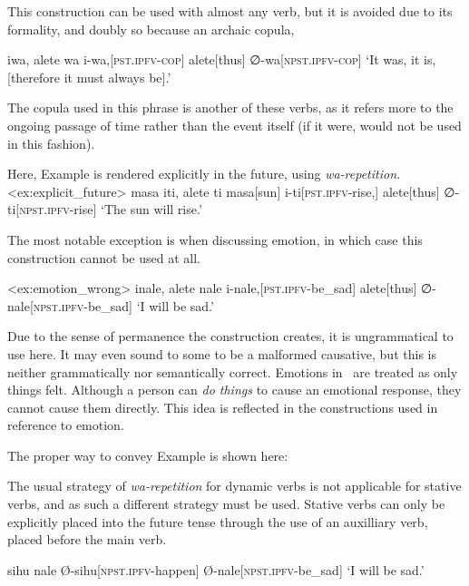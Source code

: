 This construction can be used with almost any verb, but it is avoided due to its formality, and doubly so because an archaic copula, 

\ex
\begingl
\glpreamble iwa, alete wa
\endpreamble
i-wa,[\textsc{pst.ipfv-cop}]
alete[thus]
∅-wa[\textsc{npst.ipfv-cop}]
\glft `It was, it is, [therefore it must always be].'
\endgl
\xe

The copula used in this phrase is another of these verbs, as it refers more to the ongoing passage of time rather than the event itself (if it were,  would not be used in this fashion).


Here, Example  is rendered explicitly in the future, using \textit{wa-repetition.}
\ex<ex:explicit_future>
\begingl
\glpreamble masa iti, alete ti
\endpreamble
masa[sun]
i-ti[\textsc{pst.ipfv-}rise,]
alete[thus]
∅-ti[\textsc{npst.ipfv-}rise]
\glft `The sun will rise.'
\endgl
\xe

The most notable exception is when discussing emotion, in which case this construction cannot be used at all.

\ex<ex:emotion_wrong>
\begingl
\glpreamble \ljudge{*} inale, alete nale
\endpreamble
i-nale,[\textsc{pst.ipfv-}be\_sad]
alete[thus]
∅-nale[\textsc{npst.ipfv-}be\_sad]
\glft `I will be sad.'
\endgl
\xe

Due to the sense of permanence the construction creates, it is ungrammatical to use here. It may even sound to some to be a malformed causative, but this is neither grammatically nor semantically correct. Emotions in \langname\ are treated as only things felt. Although a person can \textit{do things} to cause an emotional response, they cannot cause them directly. This idea is reflected in the constructions used in reference to emotion.

The proper way to convey Example  is shown here:

The usual strategy of \textit{wa-repetition} for dynamic verbs is not applicable for stative verbs, and as such a different strategy must be used. Stative verbs can only be explicitly placed into the future tense through the use of an auxilliary verb,  placed before the main verb.

\ex
\begingl
\glpreamble sihu nale
\endpreamble
Ø-sihu[\textsc{npst.ipfv-}happen]
Ø-nale[\textsc{npst.ipfv-}be\_sad]
\glft `I will be sad.'
\endgl
\xe

